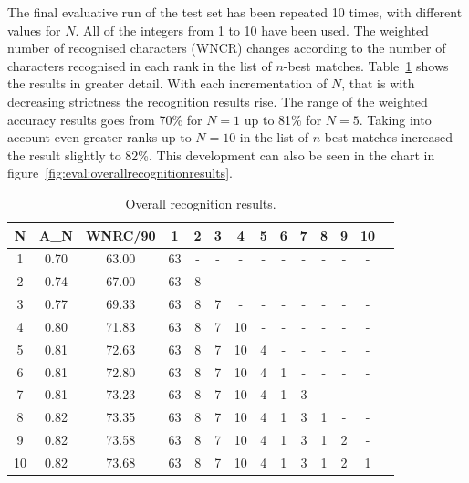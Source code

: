 The final evaluative run of the test set has been repeated 10 times, 
with different values for \(N\). All of the integers from 1 to 10 have
been used. The weighted number of recognised characters (WNCR) changes 
according to the number of characters recognised in each rank in the
list of \(n\)-best matches. Table~\ref{table:eval:overallrecognitionresults}
shows the results in greater detail. With each incrementation of \(N\),
that is with decreasing strictness the recognition results rise.
The range of the weighted accuracy results goes from 70\% for \(N=1\) 
up to 81\% for \(N=5\). Taking into account even greater ranks up 
to \(N = 10\) in the list of \(n\)-best matches increased the result slightly
to 82\%. This development can also be seen in the chart in 
figure~\ref{fig:eval:overallrecognitionresults}.
\begin{table}[htbp]
\begin{center}
  \begin{tabular}{|c|c|c|c|c|c|c|c|c|c|c|c|c|p{200pt}|}
    \hline
N & A_N  &WNRC/90&  1 & 2 & 3 & 4  & 5 & 6 & 7 & 8 & 9 & 10 \\
    \hline
1 & 0.70 & 63.00 & 63 & - & - & -  & - & - & - & - & - & -  \\
    \hline
2 & 0.74 & 67.00 & 63 & 8 & - & -  & - & - & - & - & - & -  \\
    \hline
3 & 0.77 & 69.33 & 63 & 8 & 7 & -  & - & - & - & - & - & -  \\
    \hline
4 & 0.80 & 71.83 & 63 & 8 & 7 & 10 & - & - & - & - & - & -  \\
    \hline
5 & 0.81 & 72.63 & 63 & 8 & 7 & 10 & 4 & - & - & - & - & -  \\
    \hline
6 & 0.81 & 72.80 & 63 & 8 & 7 & 10 & 4 & 1 & - & - & - & -  \\
    \hline
7 & 0.81 & 73.23 & 63 & 8 & 7 & 10 & 4 & 1 & 3 & - & - & -  \\
    \hline
8 & 0.82 & 73.35 & 63 & 8 & 7 & 10 & 4 & 1 & 3 & 1 & - & -  \\
    \hline
9 & 0.82 & 73.58 & 63 & 8 & 7 & 10 & 4 & 1 & 3 & 1 & 2 & -  \\
    \hline
10& 0.82 & 73.68 & 63 & 8 & 7 & 10 & 4 & 1 & 3 & 1 & 2 & 1  \\
    \hline
  \end{tabular}
\end{center}
\caption{Overall recognition results.}
\label{table:eval:overallrecognitionresults}
\end{table}
